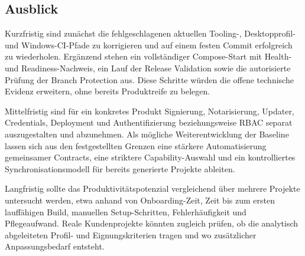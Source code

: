 \subsection{Ausblick}
\label{subsec:ausblick}

Kurzfristig sind zunächst die fehlgeschlagenen aktuellen Tooling-,
Desktopprofil- und Windows-CI-Pfade zu korrigieren und auf einem festen Commit
erfolgreich zu wiederholen. Ergänzend stehen ein vollständiger Compose-Start
mit Health- und Readiness-Nachweis, ein Lauf der Release Validation sowie die
autorisierte Prüfung der Branch Protection aus. Diese Schritte würden die
offene technische Evidenz erweitern, ohne bereits Produktreife zu belegen.

Mittelfristig sind für ein konkretes Produkt Signierung, Notarisierung,
Updater, Credentials, Deployment und Authentifizierung beziehungsweise RBAC
separat auszugestalten und abzunehmen. Als mögliche Weiterentwicklung der
Baseline lassen sich aus den festgestellten Grenzen eine stärkere
Automatisierung gemeinsamer Contracts, eine striktere Capability-Auswahl und
ein kontrolliertes Synchronisationsmodell für bereits generierte Projekte
ableiten.

Langfristig sollte das Produktivitätspotenzial vergleichend über mehrere
Projekte untersucht werden, etwa anhand von Onboarding-Zeit, Zeit bis zum
ersten lauffähigen Build, manuellen Setup-Schritten, Fehlerhäufigkeit und
Pflegeaufwand. Reale Kundenprojekte könnten zugleich prüfen, ob die analytisch
abgeleiteten Profil- und Eignungskriterien tragen und wo zusätzlicher
Anpassungsbedarf entsteht.
